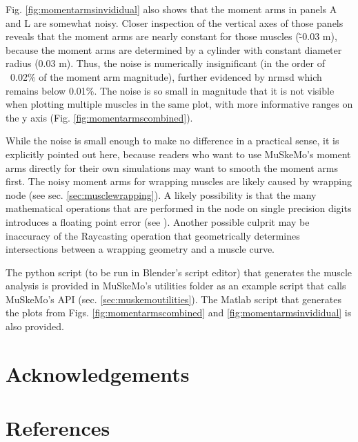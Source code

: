 \documentclass{article}
\begin{document}
Fig. \ref{fig:momentarmsinvididual} also shows that the moment arms in panels A and L are somewhat noisy. Closer inspection of the vertical axes of those panels reveals that the moment arms are nearly constant for those muscles (\~ -0.03 \si{m}), because the moment arms are determined by a cylinder with constant diameter radius (0.03 \si{m}). Thus, the noise is numerically insignificant (in the order of ~0.02\% of the moment arm magnitude), further evidenced by nrmsd which remains below 0.01\%. The noise is so small in magnitude that it is not visible when plotting multiple muscles in the same plot, with more informative ranges on the y axis (Fig. \ref{fig:momentarmscombined}).

While the noise is small enough to make no difference in a practical sense, it is explicitly pointed out here, because readers who want to use MuSkeMo's moment arms directly for their own simulations may want to smooth the moment arms first. The noisy moment arms for wrapping muscles are likely caused by wrapping node (see sec. \ref{sec:musclewrapping}). A likely possibility is that the many mathematical operations that are performed in the node on single precision digits introduces a floating point error (see ). Another possible culprit may be inaccuracy of the Raycasting operation that geometrically determines intersections between a wrapping geometry and a muscle curve.

The python script (to be run in Blender's script editor) that generates the muscle analysis is provided in MuSkeMo's utilities folder as an example script that calls MuSkeMo's API (sec. \ref{sec:muskemoutilities}). The Matlab script that generates the plots from Figs. \ref{fig:momentarmscombined} and \ref{fig:momentarmsinvididual} is also provided.

\newpage
\section{Acknowledgements}

\section*{References}
\printbibliography[heading=none] %
\end{document}
